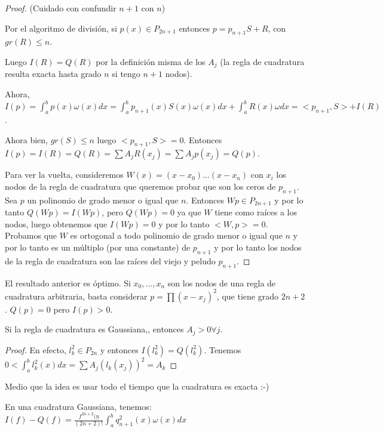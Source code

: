 \documentclass[10pt,a4paper,final]{report}
\begin{document}
\begin{proof}
	(Cuidado con confundir $n+1$ con $n$)
	
	Por el algoritmo de división, si $p(x) \in P_{2n+1}$ entonces $p = p_{n+1} S + R$, con $gr(R) \leq n$.
	
Luego $I(R) = Q(R)$ por la definición misma de los $A_j$ (la regla de cuadratura resulta exacta hasta grado $n$ si tengo $n+1$ nodos).

Ahora, $I(p) = \int_a^b p(x) \omega(x) dx = \int_a^b p_{n+1}(x) S(x) \omega(x) dx + \int_a^b R(x) \omega dx = <p_{n+1},S> + I(R)$.

Ahora bien, $gr(S) \leq n$ luego $<p_{n+1},S> = 0$. Entonces $I(p) = I(R) = Q(R) = \sum A_j R(x_j) = \sum A_j p(x_j) = Q(p)$.

Para ver la vuelta, consideremos $W(x) = (x-x_0)...(x-x_n)$ con $x_i$ los nodos de la regla de cuadratura que queremos probar que son los ceros de $p_{n+1}$. Sea $p$ un polinomio de grado menor o igual que $n$. Entonces $Wp \in P_{2n+1}$ y por lo tanto $Q(Wp) = I(Wp)$, pero $Q(Wp) = 0$ ya que $W$ tiene como raíces a los nodos, luego obtenemos que $I(Wp)=0$ y por lo tanto $<W,p>=0$. Probamos que $W$ es ortogonal a todo polinomio de grado menor o igual que $n$ y por lo tanto es un múltiplo (por una constante) de $p_{n+1}$ y por lo tanto los nodos de la regla de cuadratura son las raíces del viejo y peludo $p_{n+1}$.	
\end{proof}

\begin{observation}
El resultado anterior es óptimo. Si $x_0,...,x_n$ son los nodos de una regla de cuadratura arbitraria, basta considerar $p =\prod (x-x_j)^2$, que tiene grado $2n+2$. $Q(p)=0$ pero $I(p) > 0$.
\end{observation}

\begin{corollary}
	Si la regla de cuadratura es Gaussiana,, entonces $A_j>0 \forall j$.
\end{corollary}

\begin{proof}
	En efecto, $l_k^2 \in P_{2n}$ y entonces $I(l_k^2) = Q(l_k^2)$. Tenemos $0 < \int_a^b l_k^2(x) dx = \sum A_j (l_k(x_j))^2 = A_k$
\end{proof}

Medio que la idea es usar todo el tiempo que la cuadratura es exacta :-)

\begin{theorem}
En una cuadratura Gaussiana, tenemos:
	$I(f) - Q(f) = \frac{f^{2n+2}(\eta}{(2n+2)!} \int_a^b q_{n+1}^2(x) \omega(x) dx$
\end{theorem}
\end{document}
